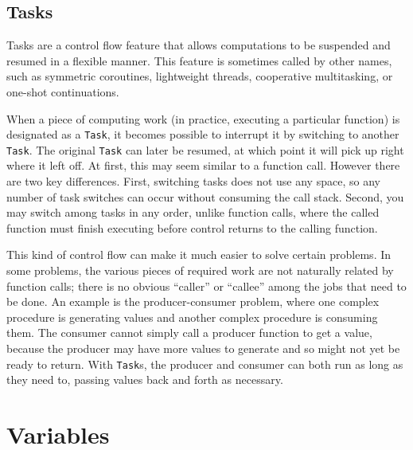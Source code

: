 \documentclass{article}
\renewcommand{\sec}[1]{\label{sec:#1}}
\begin{document}


\subsection{Tasks}\sec{tasks}

Tasks are a control flow feature that allows computations to be suspended
and resumed in a flexible manner. This feature is sometimes called by other
names, such as symmetric coroutines, lightweight threads,
cooperative multitasking, or one-shot continuations.

When a piece of computing work (in practice, executing a particular function)
is designated as a \verb|Task|, it becomes possible to interrupt it by
switching to another \verb|Task|. The original \verb|Task| can later be
resumed, at which point it will pick up right where it left off. At first,
this may seem similar to a function call. However there are two key
differences. First, switching tasks does not use any space, so any number
of task switches can occur without consuming the call stack. Second, you
may switch among tasks in any order, unlike function calls, where the called
function must finish executing before control returns to the calling
function.

This kind of control flow can make it much easier to solve certain problems.
In some problems, the various pieces of required work are not naturally
related by function calls; there is no obvious ``caller''
or ``callee'' among the jobs that need to be done. An example is the
producer-consumer problem, where one complex procedure is generating values
and another complex procedure is consuming them. The consumer cannot simply
call a producer function to get a value, because the producer may have
more values to generate and so might not yet be ready to return. With
\verb|Task|s, the producer and consumer can both run as long as they need to,
passing values back and forth as necessary.

\section{Variables}
\end{document}
